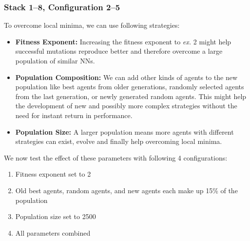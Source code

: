 \documentclass[11pt]{report}
\begin{document}
\begin{enumerate}
    \subsubsection{Stack 1--8, Configuration 2--5}
    To overcome local minima, we can use following strategies:
    \begin{itemize}
        \item \textbf{Fitness Exponent:} Increasing the fitness exponent to \textit{ex.} 2 might help successful mutations reproduce better and therefore overcome a large population of similar NNs.
        \item \textbf{Population Composition:} We can add other kinds of agents to the new population like best agents from older generations, randomly selected agents from the last generation, or newly generated random agents.
        This might help the development of new and possibly more complex strategies without the need for instant return in performance.
        \item \textbf{Population Size:} A larger population means more agents with different strategies can exist, evolve and finally help overcoming local minima.
    \end{itemize}
    We now test the effect of these parameters with following 4 configurations:
    \begin{enumerate}
        \item Fitness exponent set to 2
        \item Old best agents, random agents, and new agents each make up 15\% of the population
        \item Population size set to 2500
        \item All parameters combined
    \end{enumerate}
    \begin{figure}[H]


\end{figure}
\end{enumerate}
\end{document}
